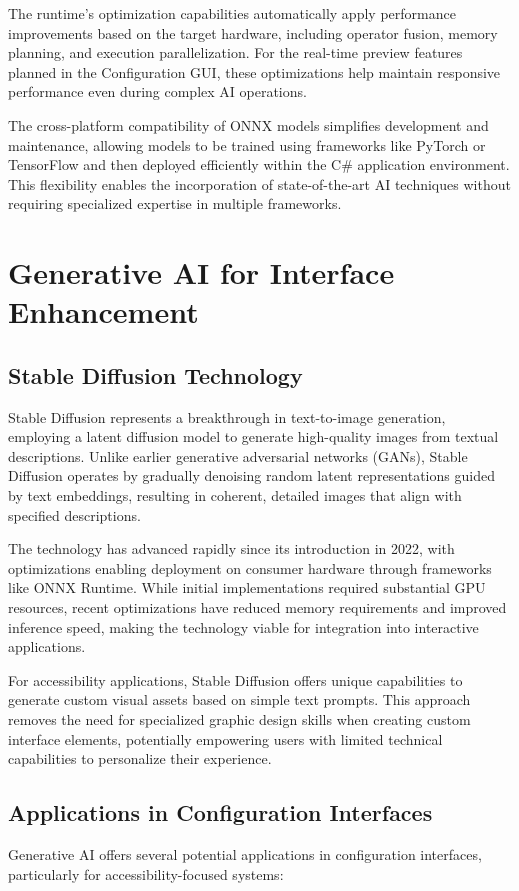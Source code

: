 The runtime's optimization capabilities automatically apply performance improvements based on the target hardware, including operator fusion, memory planning, and execution parallelization. For the real-time preview features planned in the Configuration GUI, these optimizations help maintain responsive performance even during complex AI operations.

The cross-platform compatibility of ONNX models simplifies development and maintenance, allowing models to be trained using frameworks like PyTorch or TensorFlow and then deployed efficiently within the C\# application environment. This flexibility enables the incorporation of state-of-the-art AI techniques without requiring specialized expertise in multiple frameworks.

\section{Generative AI for Interface Enhancement}
\subsection{Stable Diffusion Technology}
Stable Diffusion represents a breakthrough in text-to-image generation, employing a latent diffusion model to generate high-quality images from textual descriptions. Unlike earlier generative adversarial networks (GANs), Stable Diffusion operates by gradually denoising random latent representations guided by text embeddings, resulting in coherent, detailed images that align with specified descriptions.

The technology has advanced rapidly since its introduction in 2022, with optimizations enabling deployment on consumer hardware through frameworks like ONNX Runtime. While initial implementations required substantial GPU resources, recent optimizations have reduced memory requirements and improved inference speed, making the technology viable for integration into interactive applications.

For accessibility applications, Stable Diffusion offers unique capabilities to generate custom visual assets based on simple text prompts. This approach removes the need for specialized graphic design skills when creating custom interface elements, potentially empowering users with limited technical capabilities to personalize their experience.

\subsection{Applications in Configuration Interfaces}
Generative AI offers several potential applications in configuration interfaces, particularly for accessibility-focused systems:


